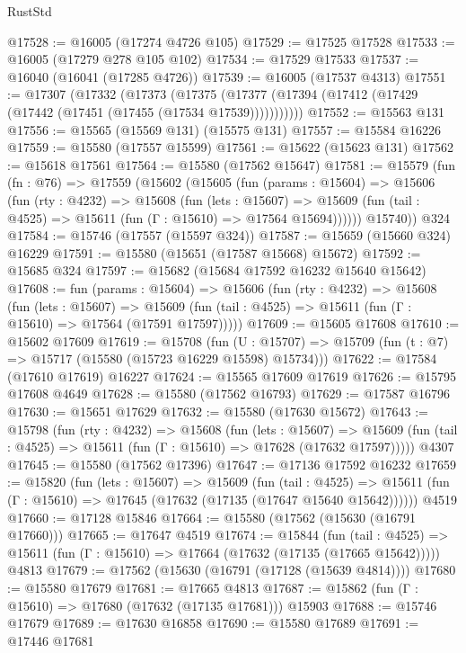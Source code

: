 \begin{lexlean}{RustStd}
\begin{coremodule}
@17528 := @16005 (@17274 @4726 @105)
@17529 := @17525 @17528
@17533 := @16005 (@17279 @278 @105 @102)
@17534 := @17529 @17533
@17537 := @16040 (@16041 (@17285 @4726))
@17539 := @16005 (@17537 @4313)
@17551 := @17307
    (@17332
      (@17373
        (@17375 (@17377 (@17394 (@17412 (@17429 (@17442 (@17451 (@17455 (@17534 @17539)))))))))))
@17552 := @15563 @131
@17556 := @15565 (@15569 @131) (@15575 @131)
@17557 := @15584 @16226
@17559 := @15580 (@17557 @15599)
@17561 := @15622 (@15623 @131)
@17562 := @15618 @17561
@17564 := @15580 (@17562 @15647)
@17581 := @15579
    (fun (fn : @76) =>
    @17559
      (@15602
        (@15605
          (fun (params : @15604) =>
          @15606
            (fun (rty : @4232) =>
            @15608
              (fun (lets : @15607) =>
              @15609 (fun (tail : @4525) => @15611 (fun (Γ : @15610) => @17564 @15694))))))
        @15740))
    @324
@17584 := @15746 (@17557 (@15597 @324))
@17587 := @15659 (@15660 @324) @16229
@17591 := @15580 (@15651 (@17587 @15668) @15672)
@17592 := @15685 @324
@17597 := @15682 (@15684 @17592 @16232 @15640 @15642)
@17608 := fun (params : @15604) =>
  @15606
    (fun (rty : @4232) =>
    @15608
      (fun (lets : @15607) =>
      @15609 (fun (tail : @4525) => @15611 (fun (Γ : @15610) => @17564 (@17591 @17597)))))
@17609 := @15605 @17608
@17610 := @15602 @17609
@17619 := @15708
    (fun (U : @15707) => @15709 (fun (t : @7) => @15717 (@15580 (@15723 @16229 @15598) @15734)))
@17622 := @17584 (@17610 @17619) @16227
@17624 := @15565 @17609 @17619
@17626 := @15795 @17608 @4649
@17628 := @15580 (@17562 @16793)
@17629 := @17587 @16796
@17630 := @15651 @17629
@17632 := @15580 (@17630 @15672)
@17643 := @15798
    (fun (rty : @4232) =>
    @15608
      (fun (lets : @15607) =>
      @15609 (fun (tail : @4525) => @15611 (fun (Γ : @15610) => @17628 (@17632 @17597)))))
    @4307
@17645 := @15580 (@17562 @17396)
@17647 := @17136 @17592 @16232
@17659 := @15820
    (fun (lets : @15607) =>
    @15609
      (fun (tail : @4525) =>
      @15611 (fun (Γ : @15610) => @17645 (@17632 (@17135 (@17647 @15640 @15642))))))
    @4519
@17660 := @17128 @15846
@17664 := @15580 (@17562 (@15630 (@16791 @17660)))
@17665 := @17647 @4519
@17674 := @15844
    (fun (tail : @4525) => @15611 (fun (Γ : @15610) => @17664 (@17632 (@17135 (@17665 @15642)))))
    @4813
@17679 := @17562 (@15630 (@16791 (@17128 (@15639 @4814))))
@17680 := @15580 @17679
@17681 := @17665 @4813
@17687 := @15862 (fun (Γ : @15610) => @17680 (@17632 (@17135 @17681))) @15903
@17688 := @15746 @17679
@17689 := @17630 @16858
@17690 := @15580 @17689
@17691 := @17446 @17681

\end{coremodule}
\end{lexlean}
